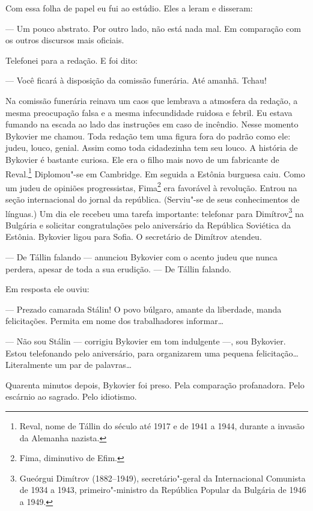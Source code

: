 Com essa folha de papel eu fui ao estúdio. Eles a leram e disseram:

--- Um pouco abstrato. Por outro lado, não está nada mal. Em comparação
com os outros discursos mais oficiais.

Telefonei para a redação. E foi dito:

--- Você ficará à disposição da comissão funerária. Até amanhã. Tchau!

\bigskip

Na comissão funerária reinava um caos que lembrava a atmosfera da
redação, a mesma preocupação falsa e a mesma infecundidade ruidosa e
febril. Eu estava fumando na escada ao lado das instruções em caso de
incêndio. Nesse momento Bykovier me chamou. Toda redação tem uma figura
fora do padrão como ele: judeu, louco, genial. Assim como toda
cidadezinha tem seu louco. A história de Bykovier é bastante curiosa.
Ele era o filho mais novo de um fabricante de Reval.\footnote{Reval,
  nome de Tállin do século  até 1917 e de 1941 a 1944, durante a
  invasão da Alemanha nazista.} Diplomou"-se em Cambridge. Em seguida a
Estônia burguesa caiu. Como um judeu de opiniões progressistas,
Fima\footnote{Fima, diminutivo de Efim.} era favorável à revolução.
Entrou na seção internacional do jornal da república. (Serviu"-se de seus
conhecimentos de línguas.) Um dia ele recebeu uma tarefa importante:
telefonar para Dimítrov\footnote{Gueórgui Dimítrov (1882--1949),
  secretário"-geral da Internacional Comunista de 1934 a 1943,
  primeiro"-ministro da República Popular da Bulgária de 1946 a 1949.} na
Bulgária e solicitar congratulações pelo aniversário da República
Soviética da Estônia. Bykovier ligou para Sofia. O secretário de
Dimítrov atendeu.

--- De Tállin falando --- anunciou Bykovier com o acento judeu que nunca
perdera, apesar de toda a sua erudição. --- De Tállin falando.

Em resposta ele ouviu:

--- Prezado camarada Stálin! O povo búlgaro, amante da liberdade, manda
felicitações. Permita em nome dos trabalhadores informar\ldots{}

--- Não sou Stálin --- corrigiu Bykovier em tom indulgente ---, sou
Bykovier. Estou telefonando pelo aniversário, para organizarem uma
pequena felicitação\ldots{} Literalmente um par de palavras\ldots{}

Quarenta minutos depois, Bykovier foi preso. Pela comparação
profanadora. Pelo escárnio ao sagrado. Pelo idiotismo.

